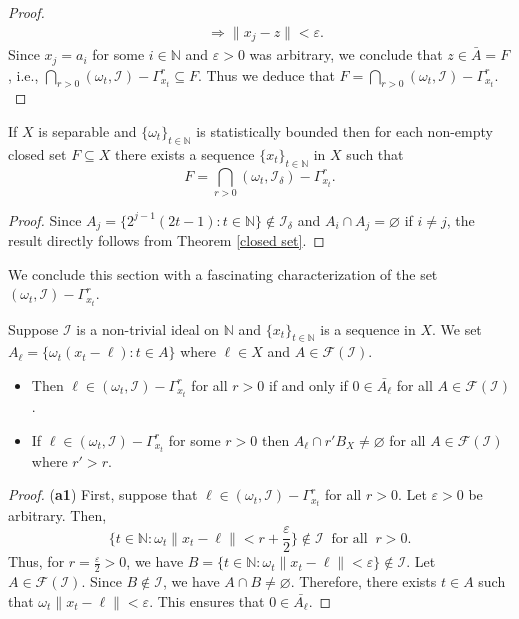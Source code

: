\documentclass[reqno]{amsart}
\begin{document}
{\begin{proof}
\begin{align*}
	&\Rightarrow \|x_j-z\|<\varepsilon.
\end{align*}
Since $x_j=a_i$ for some $i\in\mathbb{N}$ and $\varepsilon>0$ was arbitrary, we conclude that $z\in \bar{A}=F$, i.e.,  $\displaystyle\bigcap_{r>0}(\omega_t,\mathcal{I})-\Gamma_{x_t}^r\subseteq F$. Thus we deduce that
  $
  F=\displaystyle\bigcap_{r>0}(\omega_t,\mathcal{I})-\Gamma_{x_t}^r.
  $
\end{proof}
\begin{corollary}
	If $X$ is separable and $\{\omega_t\}_{t\in\mathbb{N}}$ is statistically bounded then for each non-empty closed set $F\subseteq X$ there exists a sequence $\{x_t\}_{t\in\mathbb{N}}$ in $X$ such that 
	$$
	F=\bigcap_{r>0}(\omega_t,\mathcal{I}_{\delta})-\Gamma_{x_t}^r.
	$$
\end{corollary}
\begin{proof}
 Since $A_{j}=\{2^{j-1}(2t-1):t\in\mathbb{N}\}\notin\mathcal{I}_{\delta}$ and $A_i\cap A_j=\varnothing$ if $i\neq j$, the result directly follows from Theorem \ref{closed set}. 
\end{proof}
We conclude this section with  a fascinating  characterization of the set $(\omega_t,\mathcal{I})-\Gamma_{x_t}^r$.
\begin{proposition}
Suppose $\mathcal{I}$ is a non-trivial ideal on $\mathbb{N}$ and $\{x_t\}_{t\in\mathbb{N}}$ is a sequence in $X$. We set $A_{\ell}=\{\omega_t(x_t-\ell):t\in A\}$ where $\ell\in X$ and $A\in\mathcal{F}(\mathcal{I})$.
\begin{itemize}
 \item[(\textbf{a1})] Then $\ell\in (\omega_t,\mathcal{I})-\Gamma_{x_t}^r$ for all $r>0$ if and only if $0\in \bar{A_{\ell}}$ for all $A\in\mathcal{F}(\mathcal{I})$.
\item[(\textbf{a2})] If   $\ell\in (\omega_t,\mathcal{I})-\Gamma_{x_t}^r$ for some $r>0$ then $A_{\ell}\cap r'B_X\neq\varnothing$ for all  $A\in\mathcal{F}(\mathcal{I})$ where $r'>r$.
\end{itemize}
\begin{proof}
(\textbf{a1}) First, suppose that  $\ell\in (\omega_t,\mathcal{I})-\Gamma_{x_t}^r$ for all $r>0$. Let $\varepsilon>0$ be arbitrary. Then, 
$$
\{t\in\mathbb{N}:\omega_t\|x_t-\ell\|<r+\frac{\varepsilon}{2}\}\notin\mathcal{I}~\mbox{ for all }~r>0.
$$
Thus, for $r=\frac{\varepsilon}{2}>0$, we have $B=\{t\in\mathbb{N}:\omega_t\|x_t-\ell\|<\varepsilon\}\notin\mathcal{I}$. Let $A\in\mathcal{F}(\mathcal{I})$. Since $B\notin\mathcal{I}$, we have $A\cap B\neq\varnothing$. Therefore, there exists $t\in A$ such that $\omega_t\|x_t-\ell\|<\varepsilon$. This ensures that  $0\in \bar{A_{\ell}}$.



\end{proof}
\end{proposition}}
\end{document}

